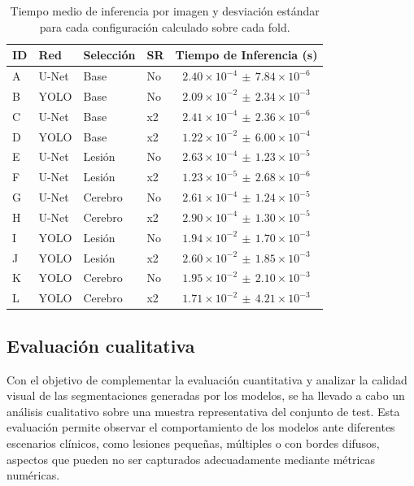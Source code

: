 \documentclass[../main.tex]{subfiles}
\begin{document}
\begin{table}[H]
\centering
\setlength{\tabcolsep}{4pt}
\caption{Tiempo medio de inferencia por imagen y desviación estándar para cada configuración calculado sobre cada fold.}
\label{tab:tiempos_inferencia}
\begin{tabular}{llllc}
\toprule
ID & Red   & Selección  & SR & Tiempo de Inferencia (s) \\
\midrule
A & U-Net & Base         & No  & $2.40 \times 10^{-4} \,\pm\, 7.84 \times 10^{-6}$ \\
B & YOLO  & Base         & No  & $2.09 \times 10^{-2} \,\pm\, 2.34 \times 10^{-3}$ \\
C & U-Net & Base         & x2  & $2.41 \times 10^{-4} \,\pm\, 2.36 \times 10^{-6}$ \\
D & YOLO  & Base         & x2  & $1.22 \times 10^{-2} \,\pm\, 6.00 \times 10^{-4}$ \\
E & U-Net & Lesión       & No  & $2.63 \times 10^{-4} \,\pm\, 1.23 \times 10^{-5}$ \\
F & U-Net & Lesión       & x2  & $1.23 \times 10^{-5} \,\pm\, 2.68 \times 10^{-6}$ \\
G & U-Net & Cerebro      & No  & $2.61 \times 10^{-4} \,\pm\, 1.24 \times 10^{-5}$ \\
H & U-Net & Cerebro      & x2  & $2.90 \times 10^{-4} \,\pm\, 1.30 \times 10^{-5}$ \\
I & YOLO  & Lesión       & No  & $1.94 \times 10^{-2} \,\pm\, 1.70 \times 10^{-3}$ \\
J & YOLO  & Lesión       & x2  & $2.60 \times 10^{-2} \,\pm\, 1.85 \times 10^{-3}$ \\
K & YOLO  & Cerebro      & No  & $1.95 \times 10^{-2} \,\pm\, 2.10 \times 10^{-3}$ \\
L & YOLO  & Cerebro      & x2  & $1.71 \times 10^{-2} \,\pm\, 4.21 \times 10^{-3}$ \\
\bottomrule
\end{tabular}
\end{table}

\subsection{Evaluación cualitativa}
Con el objetivo de complementar la evaluación cuantitativa y analizar la calidad visual de las segmentaciones generadas por los modelos, se ha llevado a cabo un análisis cualitativo sobre una muestra representativa del conjunto de test. Esta evaluación permite observar el comportamiento de los modelos ante diferentes escenarios clínicos, como lesiones pequeñas, múltiples o con bordes difusos, aspectos que pueden no ser capturados adecuadamente mediante métricas numéricas.
\end{document}
